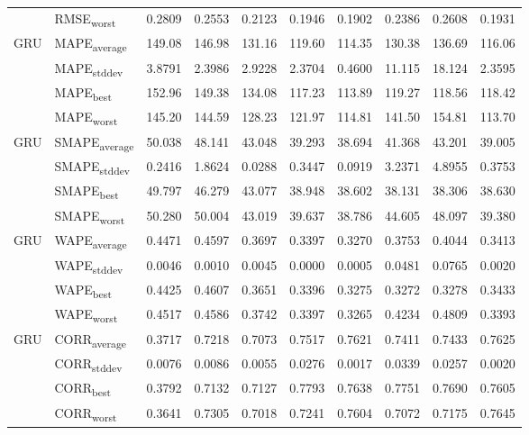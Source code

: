 {\begin{longtable}{l l c c c c c c c c}
 & RMSE\textsubscript{worst} & 0.2809 & 0.2553 & 0.2123 & 0.1946 & 0.1902 & 0.2386 & 0.2608 & 0.1931 \\
\cmidrule(lr){2-10}
\multirow{4}{*}{GRU} & MAPE\textsubscript{average} & 149.08 & 146.98 & 131.16 & 119.60 & 114.35 & 130.38 & 136.69 & 116.06 \\
 & MAPE\textsubscript{stddev} & 3.8791 & 2.3986 & 2.9228 & 2.3704 & 0.4600 & 11.115 & 18.124 & 2.3595 \\
 & MAPE\textsubscript{best} & 152.96 & 149.38 & 134.08 & 117.23 & 113.89 & 119.27 & 118.56 & 118.42 \\
 & MAPE\textsubscript{worst} & 145.20 & 144.59 & 128.23 & 121.97 & 114.81 & 141.50 & 154.81 & 113.70 \\
\cmidrule(lr){2-10}
\multirow{4}{*}{GRU} & SMAPE\textsubscript{average} & 50.038 & 48.141 & 43.048 & 39.293 & 38.694 & 41.368 & 43.201 & 39.005 \\
 & SMAPE\textsubscript{stddev} & 0.2416 & 1.8624 & 0.0288 & 0.3447 & 0.0919 & 3.2371 & 4.8955 & 0.3753 \\
 & SMAPE\textsubscript{best} & 49.797 & 46.279 & 43.077 & 38.948 & 38.602 & 38.131 & 38.306 & 38.630 \\
 & SMAPE\textsubscript{worst} & 50.280 & 50.004 & 43.019 & 39.637 & 38.786 & 44.605 & 48.097 & 39.380 \\
\cmidrule(lr){2-10}
\multirow{4}{*}{GRU} & WAPE\textsubscript{average} & 0.4471 & 0.4597 & 0.3697 & 0.3397 & 0.3270 & 0.3753 & 0.4044 & 0.3413 \\
 & WAPE\textsubscript{stddev} & 0.0046 & 0.0010 & 0.0045 & 0.0000 & 0.0005 & 0.0481 & 0.0765 & 0.0020 \\
 & WAPE\textsubscript{best} & 0.4425 & 0.4607 & 0.3651 & 0.3396 & 0.3275 & 0.3272 & 0.3278 & 0.3433 \\
 & WAPE\textsubscript{worst} & 0.4517 & 0.4586 & 0.3742 & 0.3397 & 0.3265 & 0.4234 & 0.4809 & 0.3393 \\
\cmidrule(lr){2-10}
\multirow{4}{*}{GRU} & CORR\textsubscript{average} & 0.3717 & 0.7218 & 0.7073 & 0.7517 & 0.7621 & 0.7411 & 0.7433 & 0.7625 \\
 & CORR\textsubscript{stddev} & 0.0076 & 0.0086 & 0.0055 & 0.0276 & 0.0017 & 0.0339 & 0.0257 & 0.0020 \\
 & CORR\textsubscript{best} & 0.3792 & 0.7132 & 0.7127 & 0.7793 & 0.7638 & 0.7751 & 0.7690 & 0.7605 \\
 & CORR\textsubscript{worst} & 0.3641 & 0.7305 & 0.7018 & 0.7241 & 0.7604 & 0.7072 & 0.7175 & 0.7645 \\

\end{longtable}}
